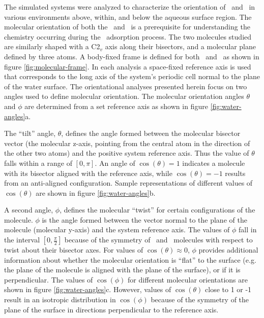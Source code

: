 	The simulated systems were analyzed to characterize the orientation of \wat~and \suldiox~in various environments above, within, and below the aqueous surface region. The molecular orientation of both the \wat~and \suldiox~is a prerequisite for understanding the chemistry occurring during the \suldiox~adsorption process. The two molecules studied are similarly shaped with a C2$_v$ axis along their bisectors, and a molecular plane defined by three atoms. A body-fixed frame is defined for both \wat~and \suldiox~as shown in figure \ref{fig:molecular-frame}. In each analysis a space-fixed reference axis is used that corresponds to the long axis of the system's periodic cell normal to the plane of the water surface. The orientational analyses presented herein focus on two angles used to define molecular orientation. The molecular orientation angles $\theta$ and $\phi$ are determined from a set reference axis as shown in figure \ref{fig:water-angles}a.
	
	The ``tilt'' angle, $\theta$, defines the angle formed between the molecular bisector vector (the molecular z-axis, pointing from the central atom in the direction of the other two atoms) and the positive system reference axis. Thus the value of $\theta$ falls within a range of $[0,\pi]$. An angle of $\cos(\theta)=1$ indicates a molecule with its bisector aligned with the reference axis, while $\cos(\theta)=-1$ results from an anti-aligned configuration. Sample representations of different values of $\cos(\theta)$ are shown in figure \ref{fig:water-angles}b.
	
	A second angle, $\phi$, defines the molecular ``twist'' for certain configurations of the molecule. $\phi$ is the angle formed between the vector normal to the plane of the molecule (molecular y-axis) and the system reference axis. The values of $\phi$ fall in the interval $[0,\frac{\pi}{2}]$ because of the symmetry of \wat~and \suldiox~molecules with respect to twist about their bisector axes. For values of $\cos(\theta) \approx 0$, $\phi$ provides additional information about whether the molecular orientation is ``flat'' to the surface (e.g. the plane of the molecule is aligned with the plane of the surface), or if it is perpendicular. The values of $\cos(\phi)$ for different molecular orientations are shown in figure \ref{fig:water-angles}c. %
	However, values of $\cos(\theta)$ close to 1 or -1 result in an isotropic distribution in $\cos(\phi)$ because of the symmetry of the plane of the surface in directions perpendicular to the reference axis.

